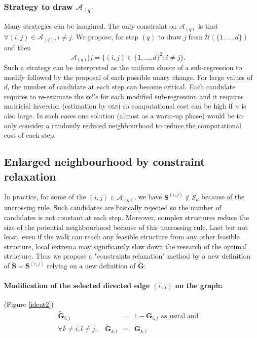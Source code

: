 \documentclass[12pt,a4paper]{report}
\begin{document}
		\subsubsection{Strategy to draw $\mathcal{A}_{(q)}$}
			Many strategies can be imagined. 
		The only constraint on $\mathcal{A}_{(q)}$ is that $\forall (i,j) \in \mathcal{A}_{(q)}, i\neq j$.				
		We propose, for step $(q)$ to draw $j$ from $\mathcal{U}(\{1,\dots,d\})$ and then 
		\begin{equation}
			\mathcal{A}_{(q)}|j=\{ (i,j) \in  \{1,\dots,d\}^2 :i \neq j \}. \nonumber 
		\end{equation}
			Such a strategy can be interpreted as the uniform choice of a sub-regression to modify followed by the proposal of each possible unary change.
			For large values of $d$, the number of candidate at each step can become critical. Each candidate requires to re-estimate the $\boldsymbol{\alpha}^j$'s for each modified sub-regression and it requires matricial inversion (estimation by \textsc{ols}) so computational cost can be high if $n$ is also large. In such cases one solution (almost as a warm-up phase) would be to only consider a randomly reduced neighbourhood to reduce the computational cost of each step.
		\subsection{Enlarged neighbourhood by constraint relaxation}
		In practice, for some of the $(i,j) \in \mathcal{A}_{(q)}$, we have $\boldsymbol{S}^{(i,j)}\notin \mathcal{S}_d$ because of the uncrossing rule. Such candidates are basically rejected so the number of candidates is not constant at each step. Moreover, complex structures reduce the size of the potential neighbourhood because of this uncrossing rule. Last but not least, even if the walk can reach any feasible structure from any other feasible structure, local extrema may significantly slow down the research of the optimal structure.
		Thus we propose a "constraints relaxation" method by a new definition of $\tilde{\boldsymbol{S}}=\boldsymbol{S}^{(i,j)}$ relying on a new definition of $\tilde{\boldsymbol{G}}$:
		\paragraph{Modification of the selected directed edge $(i,j)$ on the graph:} (Figure \ref{ident2})
	\begin{eqnarray}
		\tilde{\boldsymbol{G}}_{i,j}&=&1-\boldsymbol{G}_{i,j} \textrm{ as usual and} \nonumber \\
		\forall k \neq i, l\neq j, \quad	\tilde{\boldsymbol{G}}_{k,l}&=&\boldsymbol{G}_{k,l} \nonumber 
\end{eqnarray}	
\end{document}
